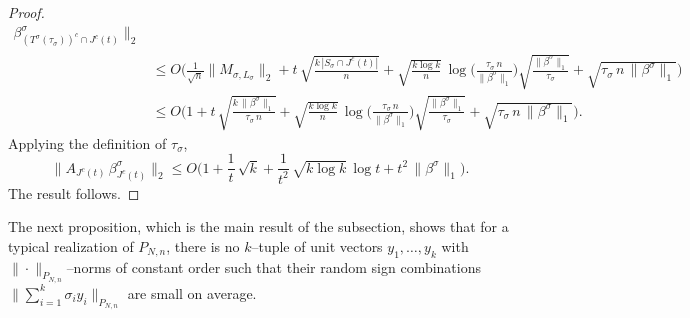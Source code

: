 \documentclass[11pt]{amsart}
\theoremstyle{definition}
\theoremstyle{plain}
\begin{document}
\begin{proof}
\begin{align*}
 \beta_{(T^\sigma(\tau_\sigma))^c \cap J^c(t)}^\sigma\big\|_2\\
 &\leq O\bigg(\frac{1}{\sqrt{n}}
 \big\|M_{\sigma,L_\sigma}\big\|_2
 +
 t\,\sqrt{\frac{k\,|S_\sigma \cap J^c(t)|}{n}} +
\sqrt{\frac{k\log k}{n}}\,\log\Big(\frac{\tau_\sigma\,n}{\|\beta^\sigma\|_1}\Big) \sqrt{\frac{\|\beta^\sigma\|_1}{\tau_\sigma}}
  + \sqrt{\tau_\sigma\,n\,\|\beta^\sigma\|_1}\bigg)\\
  &\leq
  O\bigg(1
 +
 t\,\sqrt{\frac{k\,\|\beta^\sigma\|_1}{\tau_\sigma\,n}} +
\sqrt{\frac{k\log k}{n}}\,\log\Big(\frac{\tau_\sigma\,n}{\|\beta^\sigma\|_1}\Big) \sqrt{\frac{\|\beta^\sigma\|_1}{\tau_\sigma}}
  + \sqrt{\tau_\sigma\,n\,\|\beta^\sigma\|_1}\bigg).
\end{align*}
Applying the definition of $\tau_\sigma$,
$$
\Big\|A_{J^c(t)}\, \beta_{J^c(t)}^\sigma\Big\|_2
\leq 
O\bigg(1
 +
 \frac{1}{t}\,\sqrt{k} +
\frac{1}{t^2}\,\sqrt{k\log k}\,\log t 
  + t^2\,\|\beta^\sigma\|_1\bigg).
$$
The result follows.
\end{proof}

The next proposition, which is the main result of the subsection,
shows that for a typical realization of $P_{N,n}$,
there is no $k$--tuple of unit vectors $y_1,\dots,y_k$
with $\|\cdot\|_{P_{N,n}}$--norms of constant order
such that their random sign combinations
$\big\|
\sum\nolimits_{i=1}^k \sigma_i y_i
\big\|_{P_{N,n}}$ are small on average.
\end{document}
